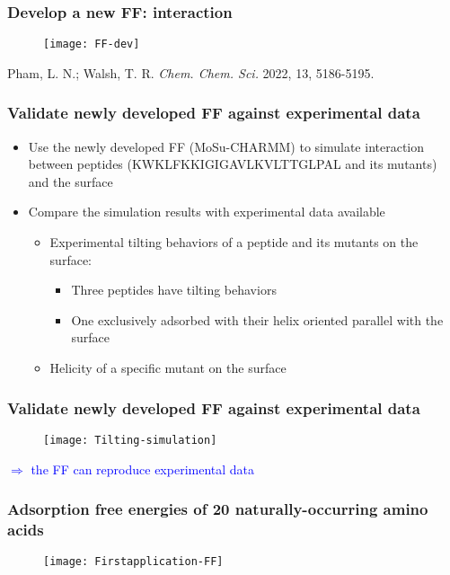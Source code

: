 \documentclass[xcolor=table,aspectratio=169]{beamer}
\begin{document}
\begin{frame}
	\frametitle{Develop a new FF:  interaction}
	\begin{figure}
		\texttt{[image: FF-dev]}
	\end{figure}
	\tiny{Pham, L. N.; Walsh, T. R. \emph{Chem. Chem. Sci.} 2022, 13, 5186-5195.}
\end{frame}

\begin{frame}
	\frametitle{Validate newly developed FF against experimental data}
	\begin{itemize}
		\item Use the newly developed FF (MoSu-CHARMM) to simulate interaction between peptides (KWKLFKKIGIGAVLKVLTTGLPAL and its mutants) and the  surface
		\item Compare the simulation results with experimental data available
		      \begin{itemize}
			      \item Experimental tilting behaviors of a peptide and its mutants on the  surface:
			            \begin{itemize}
				            \item Three peptides have tilting behaviors
				            \item One exclusively adsorbed with their helix oriented parallel with the surface
			            \end{itemize}
			      \item Helicity of a specific mutant on the  surface
		      \end{itemize}
	\end{itemize}

\end{frame}


\begin{frame}
	\frametitle{Validate newly developed FF against experimental data}
	\begin{figure}
		\texttt{[image: Tilting-simulation]}
	\end{figure}
	\textcolor{blue}{$\Rightarrow$ the FF can reproduce experimental data}
\end{frame}


\begin{frame}
	\frametitle{Adsorption free energies of 20 naturally-occurring amino acids}
	\begin{figure}
		\texttt{[image: Firstapplication-FF]}
	\end{figure}
\end{frame}
\end{document}
